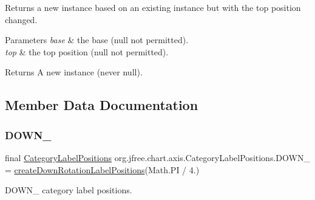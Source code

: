 Returns a new instance based on an existing instance but with the top position changed.


\begin{DoxyParams}{Parameters}
{\em base} & the base ({\ttfamily null} not permitted). \\
\hline
{\em top} & the top position ({\ttfamily null} not permitted).\\
\hline
\end{DoxyParams}
\begin{DoxyReturn}{Returns}
A new instance (never {\ttfamily null}). 
\end{DoxyReturn}


\subsection{Member Data Documentation}
\mbox{\label{classorg_1_1jfree_1_1chart_1_1axis_1_1_category_label_positions_aac24c18c1cac730e7ffc9c5f166569d5}} 
\subsubsection{\texorpdfstring{D\+O\+W\+N\+\_}{DOWN\_45}}
{\footnotesize\ttfamily final \mbox{\hyperlink{classorg_1_1jfree_1_1chart_1_1axis_1_1_category_label_positions}{Category\+Label\+Positions}} org.\+jfree.\+chart.\+axis.\+Category\+Label\+Positions.\+D\+O\+W\+N\+\_ = \mbox{\hyperlink{classorg_1_1jfree_1_1chart_1_1axis_1_1_category_label_positions_ad3126abddb79cc121679617abb76aa80}{create\+Down\+Rotation\+Label\+Positions}}(Math.\+PI / 4.)\hspace{0.3cm}{\ttfamily [static]}}

D\+O\+W\+N\+\_ category label positions. \mbox{\label{classorg_1_1jfree_1_1chart_1_1axis_1_1_category_label_positions_a03b972c86dc6de0e65967c208a56b713}} 
